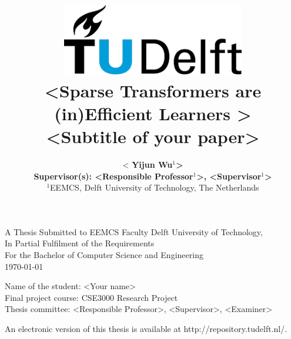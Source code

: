 \title{
    \includegraphics[width=8cm, keepaspectratio]{tudelftlogo.png}\\
    \vspace*{2cm}
    \textbf{
        \textless Sparse Transformers are (in)Efficient Learners \textgreater\\
        {\large \textless Subtitle of your paper\textgreater}
    }\\
    \vspace*{1cm}
}

\author{
    \textless \textbf{
Yijun Wu$^1$\textgreater}\\
    \hfill \break
    \textbf{Supervisor(s): \textless Responsible Professor$^1$\textgreater, \textless Supervisor$^1$\textgreater }\\
    \break
    {\large 
        \hfill \break
        $^1$EEMCS, Delft University of Technology, The Netherlands
    }\\
}

\date{}

\maketitle
\thispagestyle{empty}

\let\clearpagebackup\clearpage
\renewcommand{\clearpage}{ }

\onecolumn

\vspace*{1.5cm}
\begin{center}
    A Thesis Submitted to EEMCS Faculty Delft University of Technology,\\
    In Partial Fulfilment of the Requirements\\
    For the Bachelor of Computer Science and Engineering\\
    \today
\end{center}

\vspace*{2cm}

\noindent
{\small
Name of the student: \textless Your name\textgreater\\
Final project course: CSE3000 Research Project\\
Thesis committee: \textless Responsible Professor\textgreater, \textless Supervisor\textgreater, \textless Examiner\textgreater\\
}
\vfill

\begin{center}
    An electronic version of this thesis is available at http://repository.tudelft.nl/.
\end{center}

\twocolumn
\let\clearpage\clearpagebackup  
\clearpage
\setcounter{page}{1}
